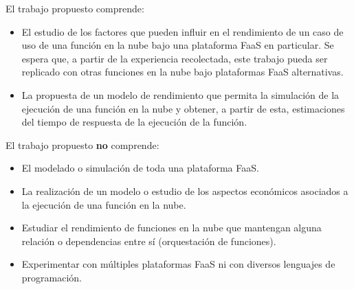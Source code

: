 El trabajo propuesto comprende:
\begin{itemize}
    \item El estudio de los factores que pueden influir en el rendimiento de un caso de uso de una función en la nube bajo una plataforma FaaS en particular. Se espera que, a partir de la experiencia recolectada, este trabajo pueda ser replicado con otras funciones en la nube bajo plataformas FaaS alternativas.
    \item La propuesta de un modelo de rendimiento que permita la simulación de la ejecución de una función en la nube y obtener, a partir de esta, estimaciones del tiempo de respuesta de la ejecución de la función.
\end{itemize}


El trabajo propuesto \textbf{no} comprende:
\begin{itemize}
    \item El modelado o simulación de toda una plataforma FaaS.
    \item La realización de un modelo o estudio de los aspectos económicos asociados a la ejecución de una función en la nube.
    \item Estudiar el rendimiento de funciones en la nube que mantengan alguna relación o dependencias entre sí (orquestación de funciones).
    \item Experimentar con múltiples plataformas FaaS ni con diversos lenguajes de programación.
    
\end{itemize}
